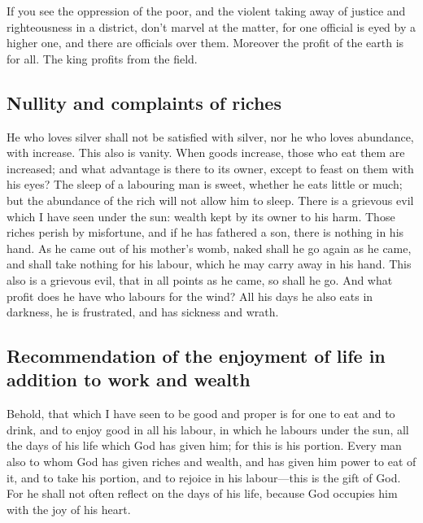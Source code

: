  If you see the oppression of the poor, and the violent
taking away of justice and righteousness in a district, don't marvel at
the matter, for one official is eyed by a higher one, and there are
officials over them.  Moreover the profit of the earth is
for all. The king profits from the field.

\hypertarget{nullity-and-complaints-of-riches}{%
\subsection{Nullity and complaints of
riches}\label{nullity-and-complaints-of-riches}}

 He who loves silver shall not be satisfied with silver,
nor he who loves abundance, with increase. This also is vanity.
 When goods increase, those who eat them are increased;
and what advantage is there to its owner, except to feast on them with
his eyes?  The sleep of a labouring man is sweet, whether
he eats little or much; but the abundance of the rich will not allow him
to sleep.  There is a grievous evil which I have seen
under the sun: wealth kept by its owner to his harm. 
Those riches perish by misfortune, and if he has fathered a son, there
is nothing in his hand.  As he came out of his mother's
womb, naked shall he go again as he came, and shall take nothing for his
labour, which he may carry away in his hand.  This also
is a grievous evil, that in all points as he came, so shall he go. And
what profit does he have who labours for the wind?  All
his days he also eats in darkness, he is frustrated, and has sickness
and wrath.

\hypertarget{recommendation-of-the-enjoyment-of-life-in-addition-to-work-and-wealth}{%
\subsection{Recommendation of the enjoyment of life in addition to work
and
wealth}\label{recommendation-of-the-enjoyment-of-life-in-addition-to-work-and-wealth}}

 Behold, that which I have seen to be good and proper is
for one to eat and to drink, and to enjoy good in all his labour, in
which he labours under the sun, all the days of his life which God has
given him; for this is his portion.  Every man also to
whom God has given riches and wealth, and has given him power to eat of
it, and to take his portion, and to rejoice in his labour---this is the
gift of God.  For he shall not often reflect on the days
of his life, because God occupies him with the joy of his heart.

